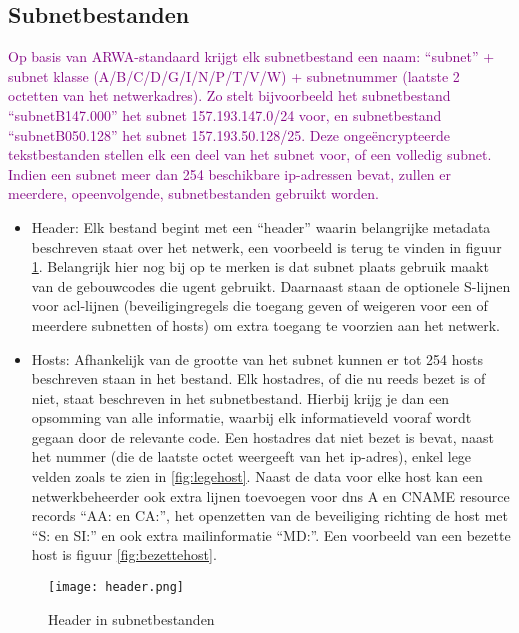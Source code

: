 \subsection{Subnetbestanden}
\label{subnetbestanden}
\textcolor{purple}{Op basis van ARWA-standaard krijgt elk subnetbestand een naam: “subnet” + subnet klasse (A/B/C/D/G/I/N/P/T/V/W) + subnetnummer (laatste 2 octetten van het netwerkadres). Zo stelt bijvoorbeeld het subnetbestand “subnetB147.000” het subnet 157.193.147.0/24 voor, en subnetbestand “subnetB050.128” het subnet 157.193.50.128/25. Deze ongeëncrypteerde tekstbestanden stellen elk een deel van het subnet voor, of een volledig subnet. Indien een subnet meer dan 254 beschikbare \acrshort{ip}-adressen bevat, zullen er meerdere, opeenvolgende, subnetbestanden gebruikt worden.}
\begin{itemize}
    \item Header: Elk bestand begint met een “header” waarin belangrijke metadata beschreven staat over het netwerk, een voorbeeld is terug te vinden in figuur \ref{fig:header}. Belangrijk hier nog bij op te merken is dat subnet plaats gebruik maakt van de gebouwcodes die \acrshort{ugent} gebruikt. Daarnaast staan de optionele S-lijnen voor \acrfull{acl}-lijnen (beveiligingregels die toegang geven of weigeren voor een of meerdere subnetten of hosts) om extra toegang te voorzien aan het netwerk. 
    \item Hosts: Afhankelijk van de grootte van het subnet kunnen er tot 254 hosts beschreven staan in het bestand. Elk hostadres, of die nu reeds bezet is of niet, staat beschreven in het subnetbestand. Hierbij krijg je dan een opsomming van alle informatie, waarbij elk informatieveld vooraf wordt gegaan door de relevante code. Een hostadres dat niet bezet is bevat, naast het nummer (die de laatste octet weergeeft van het \acrshort{ip}-adres), enkel lege velden zoals te zien in \ref{fig:legehost}. Naast de data voor elke host kan een netwerkbeheerder ook extra lijnen toevoegen voor \acrshort{dns} A en CNAME resource records “AA: en CA:”, het openzetten van de beveiliging richting de host met “S: en SI:” en ook extra mailinformatie “MD:”. Een voorbeeld van een bezette host is figuur \ref{fig:bezettehost}.
\end{itemize}

\begin{figure}[H]
    \texttt{[image: header.png]}
    \caption{Header in subnetbestanden}
    \label{fig:header}
\end{figure}

